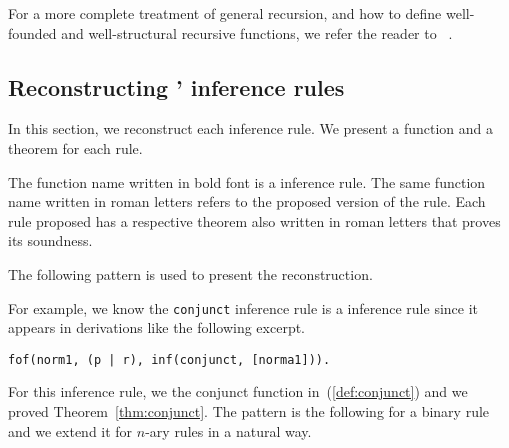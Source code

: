 \documentclass[../main.tex]{subfiles}
\begin{document}
For a more complete treatment of general recursion, and how to
define well-founded and well-structural recursive functions, we refer
the reader to \citeauthor{Bove2005}~\cite{Bove2005}.


\subsection{Reconstructing \Metis' inference rules}
\label{ssec:emulating-inferences}

In this section, we reconstruct each \Metis inference rule.
We present a function and a theorem for each rule.

\begin{notation}
The function name written in bold font is a \Metis inference rule.
The same function name written in roman letters refers to the proposed
version of the rule.
Each rule proposed has a respective theorem also written in roman letters
that proves its soundness.
\end{notation}

The following pattern is used to present the reconstruction.

For example, we know the \verb!conjunct! inference rule is a
\Metis inference rule since it appears in \TSTP derivations like
the following excerpt.

\begin{verbatim}
fof(norm1, (p | r), inf(conjunct, [norma1])).
\end{verbatim}

For this inference rule, we the \rm{conjunct} function in~(\ref{def:conjunct}) and we proved Theorem~\ref{thm:conjunct}. The pattern is the following for
a binary rule and we extend it for $n$-ary rules in a natural way.
\end{document}
